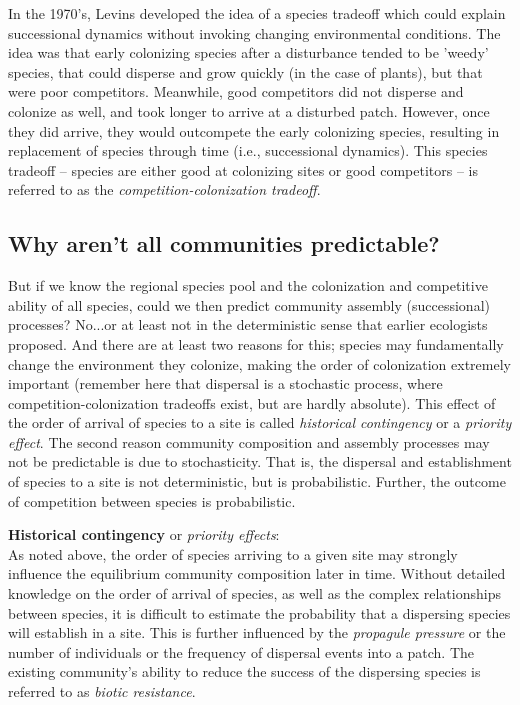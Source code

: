 \documentclass[12pt]{article}
\begin{document}
In the 1970's, Levins developed the idea of a species tradeoff which could explain successional dynamics without invoking changing environmental conditions. The idea was that early colonizing species after a disturbance tended to be 'weedy' species, that could disperse and grow quickly (in the case of plants), but that were poor competitors. Meanwhile, good competitors did not disperse and colonize as well, and took longer to arrive at a disturbed patch. However, once they did arrive, they would outcompete the early colonizing species, resulting in replacement of species through time (i.e., successional dynamics). This species tradeoff -- species are either good at colonizing sites or good competitors -- is referred to as the \textit{competition-colonization tradeoff}. 







\clearpage

\subsection*{Why aren't all communities predictable?}

But if we know the regional species pool and the colonization and competitive ability of all species, could we then predict community assembly (successional) processes? No...or at least not in the deterministic sense that earlier ecologists proposed. And there are at least two reasons for this; species may fundamentally change the environment they colonize, making the order of colonization extremely important (remember here that dispersal is a stochastic process, where competition-colonization tradeoffs exist, but are hardly absolute). This effect of the order of arrival of species to a site is called \textit{historical contingency} or a \textit{priority effect}. The second reason community composition and assembly processes may not be predictable is due to stochasticity. That is, the dispersal and establishment of species to a site is not deterministic, but is probabilistic. Further, the outcome of competition between species is probabilistic. 



\textbf{Historical contingency} or \textit{priority effects}: \\
As noted above, the order of species arriving to a given site may strongly influence the equilibrium community composition later in time. Without detailed knowledge on the order of arrival of species, as well as the complex relationships between species, it is difficult to estimate the probability that a dispersing species will establish in a site. This is further influenced by the \textit{propagule pressure} or the number of individuals or the frequency of dispersal events into a patch. The existing community's ability to reduce the success of the dispersing species is referred to as \textit{biotic resistance}. 
\end{document}
